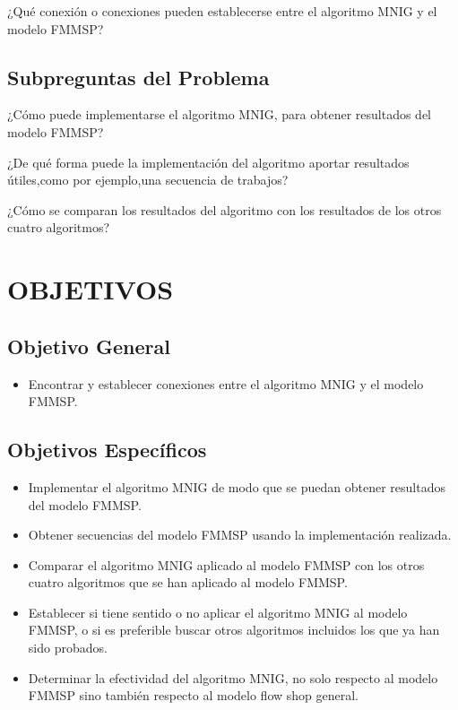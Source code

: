 \documentclass{article}
\begin{document}
¿Qué conexión o conexiones pueden establecerse entre el algoritmo MNIG y el modelo FMMSP?

\subsection{Subpreguntas del Problema}

\indent\indent
¿Cómo puede implementarse el algoritmo MNIG, para obtener resultados del modelo FMMSP?

¿De qué forma puede la implementación del algoritmo aportar resultados útiles,como por ejemplo,una secuencia de trabajos?

¿Cómo se comparan los resultados del algoritmo con los resultados de los otros cuatro algoritmos?

\section{OBJETIVOS}

\subsection{Objetivo General}

\begin{itemize}
    \item Encontrar y establecer conexiones entre el algoritmo MNIG y el modelo FMMSP.
\end{itemize}

\subsection{Objetivos Específicos}

\begin{itemize}
    \item Implementar el algoritmo MNIG de modo que se puedan obtener resultados del modelo FMMSP.
    \item Obtener secuencias del modelo FMMSP usando la implementación realizada.
    \item Comparar el algoritmo MNIG aplicado al modelo FMMSP con los otros cuatro algoritmos que se han aplicado al modelo FMMSP.
    \item Establecer si tiene sentido o no aplicar el algoritmo MNIG al modelo FMMSP, o si es preferible buscar otros algoritmos incluidos los que ya han sido probados.
    \item Determinar la efectividad del algoritmo MNIG, no solo respecto al modelo FMMSP sino también respecto al modelo flow shop general.
\end{itemize}
\end{document}
